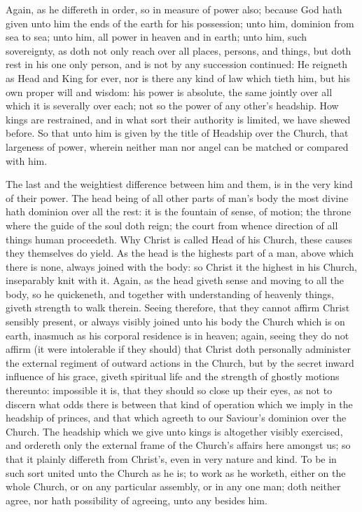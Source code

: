 Again, as he differeth in order, so in measure of power also; because God hath given unto him the ends of the earth for his possession; unto him, dominion from sea to sea; unto him, all power in heaven and in earth; unto him, such sovereignty, as doth not only reach over all places, persons, and things, but doth rest in his one only person, and is not by any succession continued: He reigneth as Head and King for ever, nor is there any kind of law which tieth him, but his own proper will and wisdom: his power is absolute, the same jointly over all which it is severally over each; not so the power of any other’s headship. How kings are restrained, and in what sort their authority is limited, we have shewed before. So that unto him is given by the title of Headship over the Church, that largeness of power, wherein neither man nor angel can be matched or compared with him.

The last and the weightiest difference between him and them, is in the very kind of their power. The head being of all other parts of man’s body the most divine hath dominion over all the rest: it is the fountain of sense, of motion; the throne where the guide of the soul doth reign; the court from whence direction of all things human proceedeth.  Why Christ is called Head of his Church, these causes they themselves do yield. As the head is the highests part of a man, above which there is none, always joined with the body: so Christ it the highest in his Church, inseparably knit with it. Again, as the head giveth sense and moving to all the body, so he quickeneth, and together with understanding of heavenly things, giveth strength to walk therein. Seeing therefore, that they cannot affirm Christ sensibly present, or always visibly joined unto his body the Church which is on earth, inasmuch as his corporal residence is in heaven; again, seeing they do not affirm (it were intolerable if they should) that Christ doth personally administer the external regiment of outward actions in the Church, but by the secret inward influence of his grace, giveth spiritual life and the strength of ghostly motions thereunto: impossible it is, that they should so close up their eyes, as not to discern what odds there is between that kind of operation which we imply in the headship of princes, and that which agreeth to our Saviour’s dominion over the Church. The headship which we give unto kings is altogether visibly exercised, and ordereth only the external frame of the Church’s affairs here amongst us; so that it plainly differeth from Christ’s, even in very nature and kind. To be in such sort united unto the Church as he is; to work as he worketh, either on the whole Church, or on any particular assembly, or in any one man; doth neither agree, nor hath possibility of agreeing, unto any besides him.

